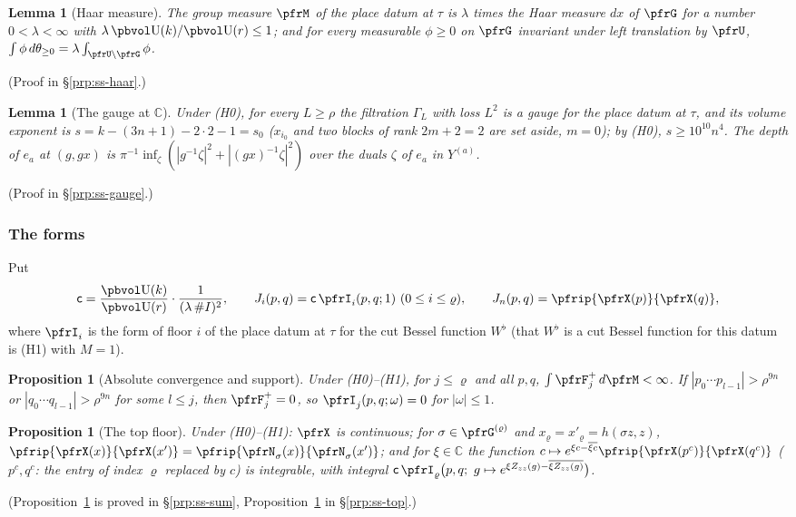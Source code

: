 \documentclass[10pt]{amsart}
\newtheorem{proposition}[theorem]{Proposition}
\newtheorem{lemma}[theorem]{Lemma}
\theoremstyle{definition}
\theoremstyle{remark}
\newcommand{\C}{\mathbb C}
\providecommand{\auU}{\mathrm U}
\begin{document}
\begin{lemma}[Haar measure]\label{pfr:haar}
The group measure $\pfrM$ of the place datum at $\tau$ is $\lambda$ times the Haar measure $dx$ of
$\pfrG$ for a number $0<\lambda<\infty$ with $\lambda\,\pbvol\auU(k)/\pbvol\auU(r)\le1$; and for every
measurable $\phi\ge0$ on $\pfrG$ invariant under left translation by $\pfrU$,
$\int\phi\,d\theta_{\ge0}=\lambda\int_{\pfrU\backslash\pfrG}\phi$.
\end{lemma}
(Proof in \S\ref{prp:ss-haar}.)

\begin{lemma}[The gauge at $\C$]\label{pfr:realgauge}
Under \textup{(H0)}, for every $L\ge\rho$ the filtration $\Gamma_L$ with loss $L^2$ is a gauge for the
place datum at $\tau$, and its volume exponent is $s=k-(3n+1)-2\cdot2-1=s_0$ ($x_{i_0}$ and two blocks of rank
$2m+2=2$ are set aside, $m=0$); by (H0), $s\ge10^{10}n^4$. The depth of $e_a$ at
$(g,gx)$ is $\pi^{-1}\inf_\zeta(|g^{-1}\zeta|^2+|(gx)^{-1}\zeta|^2)$ over the duals $\zeta$ of $e_a$ in
$Y^{(a)}$.
\end{lemma}
(Proof in \S\ref{prp:ss-gauge}.)

\subsubsection*{The forms}
Put
\begin{equation}\label{pfr:eq-c}
\mathsf c=\frac{\pbvol\auU(k)}{\pbvol\auU(r)}\cdot\frac1{(\lambda\,\#I)^2},\qquad
J_i(p,q)=\mathsf c\,\pfrI_i(p,q;1)\ (0\le i\le\varrho),\qquad J_n(p,q)=\pfrip{\pfrX(p)}{\pfrX(q)},
\end{equation}
where $\pfrI_i$ is the form of floor $i$ of the place datum at $\tau$ for the cut Bessel function
$W^\flat$ (that $W^\flat$ is a cut Bessel function for this datum is (H1) with $M=1$).

\begin{proposition}[Absolute convergence and support]\label{pfr:conv}
Under \textup{(H0)}--\textup{(H1)}, for $j\le\varrho$ and all $p,q$, $\int\pfrF^+_j\,d\pfrM<\infty$.
If $|p_0\cdots p_{l-1}|>\rho^{9n}$ or $|q_0\cdots q_{l-1}|>\rho^{9n}$ for some $l\le j$, then
$\pfrF^+_j=0$, so $\pfrI_j(p,q;\omega)=0$ for $|\omega|\le1$.
\end{proposition}

\begin{proposition}[The top floor]\label{pfr:top}
Under \textup{(H0)}--\textup{(H1)}: $\pfrX$ is continuous; for $\sigma\in\pfrG^{(\varrho)}$ and
$x_\varrho=x'_\varrho=h(\sigma z,z)$, $\pfrip{\pfrX(x)}{\pfrX(x')}=\pfrip{\pfrN_\sigma(x)}{\pfrN_\sigma(x')}$; and
for $\xi\in\C$ the function $c\mapsto e^{\xi c-\overline{\xi c}}\pfrip{\pfrX(p^c)}{\pfrX(q^c)}$ ($p^c,q^c$:
the entry of index $\varrho$ replaced by $c$) is integrable, with integral
$\mathsf c\,\pfrI_\varrho\bigl(p,q;\ g\mapsto e^{\xi Z_{zz}(g)-\overline{\xi Z_{zz}(g)}}\bigr)$.
\end{proposition}
(Proposition~\ref{pfr:conv} is proved in \S\ref{prp:ss-sum}, Proposition~\ref{pfr:top} in \S\ref{prp:ss-top}.)
\end{document}
